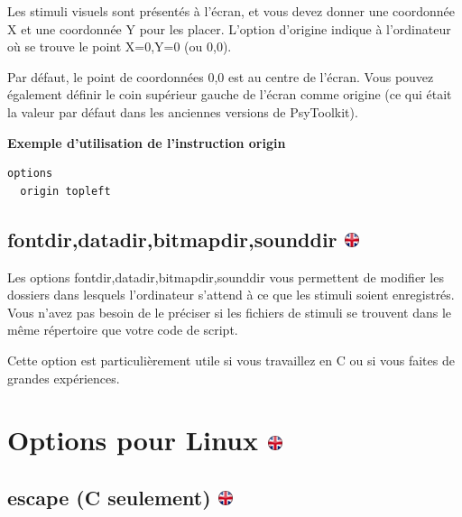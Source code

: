 \documentclass[
]{book}
\begin{document}
Les stimuli visuels sont présentés à l'écran, et vous devez donner une coordonnée X et une coordonnée Y pour les placer. L'option d'origine indique à l'ordinateur où se trouve le point X=0,Y=0 (ou 0,0).

Par défaut, le point de coordonnées 0,0 est au centre de l'écran. Vous pouvez également définir le coin supérieur gauche de l'écran comme origine (ce qui était la valeur par défaut dans les anciennes versions de PsyToolkit).

\textbf{Exemple d'utilisation de l'instruction origin}

\begin{verbatim}
options
  origin topleft
\end{verbatim}

\hypertarget{fontdirdatadirbitmapdirsounddir}{%
\subsection[fontdir,datadir,bitmapdir,sounddir ]{\texorpdfstring{fontdir,datadir,bitmapdir,sounddir \href{https://www.psytoolkit.org/doc3.4.0/syntax.html\#options-sounddir}{\protect\includegraphics{img/ukflag.png}}}{fontdir,datadir,bitmapdir,sounddir }}\label{fontdirdatadirbitmapdirsounddir}}

Les options fontdir,datadir,bitmapdir,sounddir vous permettent de modifier les dossiers dans lesquels l'ordinateur s'attend à ce que les stimuli soient enregistrés. Vous n'avez pas besoin de le préciser si les fichiers de stimuli se trouvent dans le même répertoire que votre code de script.

Cette option est particulièrement utile si vous travaillez en C ou si vous faites de grandes expériences.

\hypertarget{options-pour-linux}{%
\section[Options pour Linux ]{\texorpdfstring{Options pour Linux \href{https://www.psytoolkit.org/doc3.4.0/syntax.html\#options-sounddir}{\protect\includegraphics{img/ukflag.png}}}{Options pour Linux }}\label{options-pour-linux}}

\hypertarget{escape-c-seulement}{%
\subsection[escape (C seulement) ]{\texorpdfstring{escape (C seulement) \href{https://www.psytoolkit.org/doc3.4.0/syntax.html\#options-escape}{\protect\includegraphics{img/ukflag.png}}}{escape (C seulement) }}\label{escape-c-seulement}}
\end{document}
